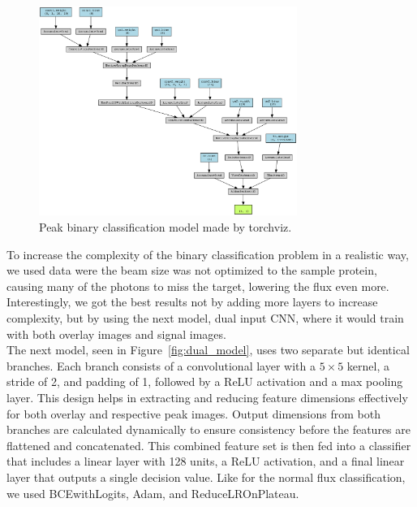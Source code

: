 \documentclass[12pt]{article}
\begin{document}
\begin{figure}[H]
    \centering
    \includegraphics[width=0.75\textwidth]{models/peak_binary_model.png.png}
    \caption{Peak binary classification model made by torchviz.}
    \label{fig:binary_model}
\end{figure}

To increase the complexity of the binary classification problem in a realistic way, we used data were the beam size was not optimized to the sample protein, causing many of the photons to miss the target, lowering the flux even more. Interestingly, we got the best results not by adding more layers to increase complexity, but by using the next model, dual input CNN, where it would train with both overlay images and signal images.\\

The next model, seen in Figure~\ref{fig:dual_model}, uses two separate but identical branches. Each branch consists of a convolutional layer with a \(5\times5\) kernel, a stride of 2, and padding of 1, followed by a ReLU activation and a max pooling layer. This design helps in extracting and reducing feature dimensions effectively for both overlay and respective peak images. Output dimensions from both branches are calculated dynamically to ensure consistency before the features are flattened and concatenated. This combined feature set is then fed into a classifier that includes a linear layer with 128 units, a ReLU activation, and a final linear layer that outputs a single decision value. Like for the normal flux classification, we used BCEwithLogits, Adam, and ReduceLROnPlateau.\\
\end{document}

